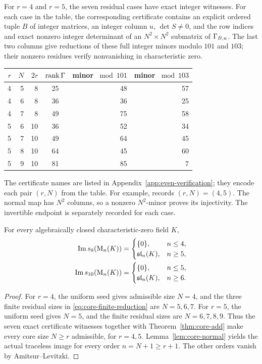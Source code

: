 For $r=4$ and $r=5$, the seven residual cases have exact
integer witnesses. For each case in the table, the corresponding
certificate contains an explicit ordered tuple $B$ of integer matrices,
an integer column $u$,
$\det S\ne0$, and the row indices and exact nonzero integer
determinant of an $N^2\times N^2$ submatrix of
$\Gamma_{B,u}$. The last two columns give reductions of these full integer
minors modulo $101$ and $103$; their nonzero residues verify
nonvanishing in characteristic zero.
\begin{center}
\small
\begin{tabular}{@{}rrrcrr@{}}
\toprule
$r$ & $N$ & $2r$ & $\operatorname{rank}\Gamma$ & minor $\bmod 101$ & minor $\bmod 103$\\
\midrule
4&5&8&25&48&57\\
4&6&8&36&36&25\\
4&7&8&49&75&58\\
5&6&10&36&52&34\\
5&7&10&49&64&45\\
5&8&10&64&45&60\\
5&9&10&81&85&7\\
\bottomrule
\end{tabular}
\end{center}
The certificate names are listed in
Appendix~\ref{app:even-verification}; they encode each pair $(r,N)$
from the table. For example,
 records $(r,N)=(4,5)$. The normal map has $N^2$
columns, so a nonzero $N^2$-minor proves its injectivity.
The invertible endpoint is separately recorded for each case.

\begin{theorem}
\label{thm:even-eight-ten}
For every algebraically closed characteristic-zero field $K$,
\begin{equation}\label{eq:eight-ten}
\begin{aligned}
 \operatorname{Im} s_8(\mathrm{M}_n(K))&=
 \begin{cases}\{0\},&n\le4,\\\mathfrak{sl}_n(K),&n\ge5,\end{cases}\\
 \operatorname{Im} s_{10}(\mathrm{M}_n(K))&=
 \begin{cases}\{0\},&n\le5,\\\mathfrak{sl}_n(K),&n\ge6.\end{cases}
\end{aligned}
\end{equation}
\end{theorem}
\begin{proof}
\enlargethispage{2\baselineskip}
For $r=4$, the uniform seed gives admissible size $N=4$,
and the three finite residual sizes in
\eqref{eq:core-finite-reduction} are $N=5,6,7$.
For $r=5$, the uniform seed gives $N=5$, and the finite
residual sizes are $N=6,7,8,9$. Thus the seven exact
certificate witnesses together with Theorem~\ref{thm:core-add}
make every core size $N\ge r$ admissible, for $r=4,5$.
Lemma~\ref{lem:core-normal} yields the actual traceless image
for every order $n=N+1\ge r+1$. The other orders vanish by
Amitsur--Levitzki.
\end{proof}

